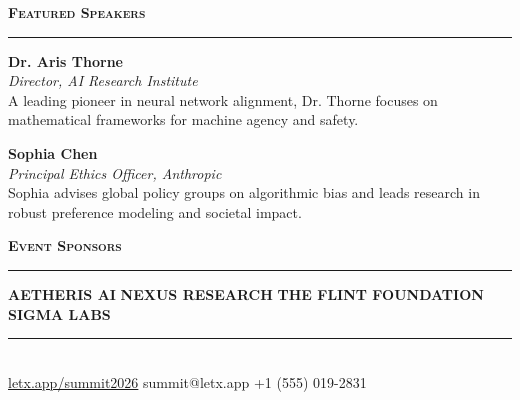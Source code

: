\documentclass[10pt]{article}
\newcommand{\eventsection}[1]{%
  \vspace{0.35cm}
  {\color{primary}\scshape\large\bfseries #1}%
  \nopagebreak\\[-0.1cm]
  {\color{accent}\rule{\linewidth}{1pt}}%
  \vspace{0.2cm}
}
\begin{document}
\eventsection{Featured Speakers}

\noindent
\begin{minipage}[t]{0.48\linewidth}
  \begin{tcolorbox}[
    colback=light!40,
    colframe=accent!40,
    arc=1.5mm,
    boxrule=0.8pt,
    left=3mm, right=3mm, top=3mm, bottom=3mm,
    boxsep=0mm,
    before skip=0pt, after skip=0pt
  ]
    {\bfseries\color{primary} Dr. Aris Thorne} \\
    {\small\em\color{accent} Director, AI Research Institute} \\[0.08cm]
    {\small\color{dark} A leading pioneer in neural network alignment, Dr. Thorne focuses on mathematical frameworks for machine agency and safety.}
  \end{tcolorbox}
\end{minipage}\hfill
\begin{minipage}[t]{0.48\linewidth}
  \begin{tcolorbox}[
    colback=light!40,
    colframe=accent!40,
    arc=1.5mm,
    boxrule=0.8pt,
    left=3mm, right=3mm, top=3mm, bottom=3mm,
    boxsep=0mm,
    before skip=0pt, after skip=0pt
  ]
    {\bfseries\color{primary} Sophia Chen} \\
    {\small\em\color{accent} Principal Ethics Officer, Anthropic} \\[0.08cm]
    {\small\color{dark} Sophia advises global policy groups on algorithmic bias and leads research in robust preference modeling and societal impact.}
  \end{tcolorbox}
\end{minipage}

\eventsection{Event Sponsors}
\begin{center}
  \small\color{muted}
  \textbf{\color{dark}AETHERIS AI} \quad \makebox[0.4cm]{\color{accent}$\diamond$} \quad
  \textbf{\color{dark}NEXUS RESEARCH} \quad \makebox[0.4cm]{\color{accent}$\diamond$} \quad
  \textbf{\color{dark}THE FLINT FOUNDATION} \quad \makebox[0.4cm]{\color{accent}$\diamond$} \quad
  \textbf{\color{dark}SIGMA LABS}
\end{center}

\vspace*{\fill}
\begin{center}
  {\color{accent}\rule{0.6\linewidth}{0.8pt}}\\[0.15cm]
  {\small\color{muted}
    \faGlobe \hspace{0.1cm} \href{https://letx.app}{letx.app/summit2026} \quad \makebox[0.3cm]{|} \quad
    \faEnvelope \hspace{0.1cm} summit@letx.app \quad \makebox[0.3cm]{|} \quad
    \faPhone \hspace{0.1cm} +1 (555) 019-2831
  }
\end{center}
\vspace*{0.1cm}
\end{document}
